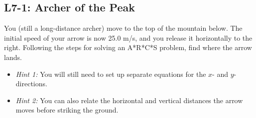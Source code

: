 \documentclass[]{article}
\begin{document}
\begin{PresentSpace}
	\vspace{-10pt}
	\section*{L7-1: Archer of the Peak}
	\vspace{-10pt}
	You (still a long-distance archer) move to the top of the mountain below. The initial speed of your arrow is now 25.0 m/s, and you release it horizontally to the right. Following the steps for solving an A*R*C*S problem, find where the arrow lands.
	\begin{itemize}
		\item \textit{Hint 1:} You will still need to set up separate equations for the $x$- and $y$-directions.
		\item \textit{Hint 2:} You can also relate the horizontal and vertical distances the arrow moves before striking the ground.
	\end{itemize}
	\begin{center}
	\end{center}
\end{PresentSpace}
\newpage
\end{document}
